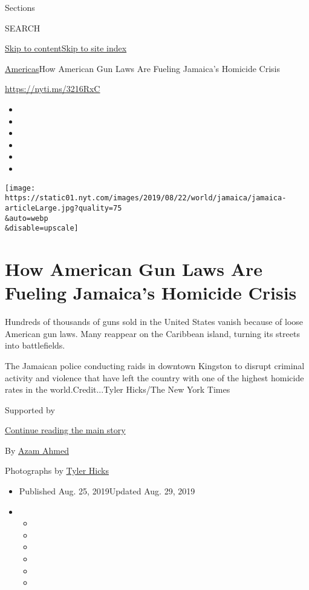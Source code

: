 Sections

SEARCH

\protect\hyperlink{site-content}{Skip to
content}\protect\hyperlink{site-index}{Skip to site index}

\href{/section/world/americas}{Americas}\textbar{}How American Gun Laws
Are Fueling Jamaica's Homicide Crisis

\url{https://nyti.ms/3216RxC}

\begin{itemize}
\item
\item
\item
\item
\item
\item
\end{itemize}

\texttt{[image: https://static01.nyt.com/images/2019/08/22/world/jamaica/jamaica-articleLarge.jpg?quality=75\\\&auto=webp\\\&disable=upscale]}

\hypertarget{how-american-gun-laws-are-fueling-jamaicas-homicide-crisis}{%
\section{How American Gun Laws Are Fueling Jamaica's Homicide
Crisis}\label{how-american-gun-laws-are-fueling-jamaicas-homicide-crisis}}

Hundreds of thousands of guns sold in the United States vanish because
of loose American gun laws. Many reappear on the Caribbean island,
turning its streets into battlefields.

The Jamaican police conducting raids in downtown Kingston to disrupt
criminal activity and violence that have left the country with one of
the highest homicide rates in the world.Credit...Tyler Hicks/The New
York Times

Supported by

\protect\hyperlink{after-sponsor}{Continue reading the main story}

By \href{https://www.nytimes.com/by/azam-ahmed}{Azam Ahmed}

Photographs by \href{https://www.nytimes.com/by/tyler-hicks}{Tyler
Hicks}

\begin{itemize}
\item
  Published Aug. 25, 2019Updated Aug. 29, 2019
\item
  \begin{itemize}
  \item
  \item
  \item
  \item
  \item
  \item
  \end{itemize}
\end{itemize}

